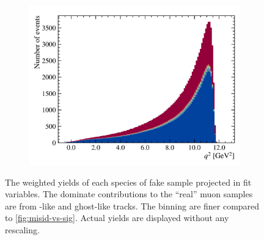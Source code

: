 \begin{figure}[!htb]
    \hfill
    \begin{subfigure}[b]{0.32\textwidth}
        \centering
        \includegraphics[width=\textwidth]{figs-fit-fit-templates/data-driven-plots/misid/D0_q2.pdf}
    \end{subfigure}
    \caption[Weighted yields of fake \muon sample.]{
        The weighted yields of each species of fake \muon sample projected in
        fit variables.
        The dominate contributions to the ``real'' muon samples are from
        \pion-like and ghost-like tracks.
        The binning are finer compared to \cref{fig:misid-vs-sig}. Actual
        yields are displayed without any rescaling.
    }
    \label{fig:unfolding-fit-vars}
\end{figure}

